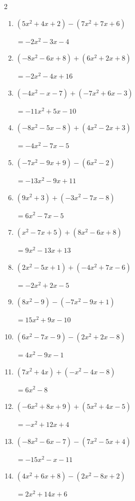 \begin{multicols}{2}
\begin{enumerate}
\resetques

  \item $(5x^{2}+4x+2)-(7x^{2}+7x+6)$

        $=-2x^{2}-3x-4$

  \item $(-8x^{2}-6x+8)+(6x^{2}+2x+8)$

        $=-2x^{2}-4x+16$

  \item $(-4x^{2}-x-7)+(-7x^{2}+6x-3)$

        $=-11x^{2}+5x-10$

  \item $(-8x^{2}-5x-8)+(4x^{2}-2x+3)$

        $=-4x^{2}-7x-5$

  \item $(-7x^{2}-9x+9)-(6x^{2}-2)$

        $=-13x^{2}-9x+11$

  \item $(9x^{2}+3)+(-3x^{2}-7x-8)$

        $=6x^{2}-7x-5$

  \item $(x^{2}-7x+5)+(8x^{2}-6x+8)$

        $=9x^{2}-13x+13$

  \item $(2x^{2}-5x+1)+(-4x^{2}+7x-6)$

        $=-2x^{2}+2x-5$

  \item $(8x^{2}-9)-(-7x^{2}-9x+1)$

        $=15x^{2}+9x-10$

  \item $(6x^{2}-7x-9)-(2x^{2}+2x-8)$

        $=4x^{2}-9x-1$

  \item $(7x^{2}+4x)+(-x^{2}-4x-8)$

        $=6x^{2}-8$

  \item $(-6x^{2}+8x+9)+(5x^{2}+4x-5)$

        $=-x^{2}+12x+4$

  \item $(-8x^{2}-6x-7)-(7x^{2}-5x+4)$

        $=-15x^{2}-x-11$

  \item $(4x^{2}+6x+8)-(2x^{2}-8x+2)$

        $=2x^{2}+14x+6$


\end{enumerate}
\end{multicols}
